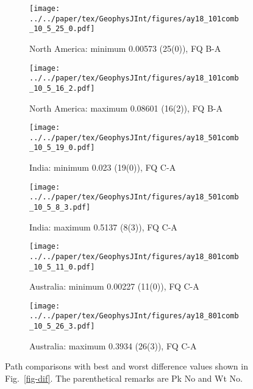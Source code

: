 \begin{figure*}
	\centering
	\begin{subfigure}{.42\textwidth} %
		\texttt{[image: ../../paper/tex/GeophysJInt/figures/ay18\_101comb\_10\_5\_25\_0.pdf]}
		\caption{North America: minimum 0.00573 (25(0)), FQ
		B-A}\label{fig-nac-105250}
	\end{subfigure}
	\begin{subfigure}{.42\textwidth} %
		\texttt{[image: ../../paper/tex/GeophysJInt/figures/ay18\_101comb\_10\_5\_16\_2.pdf]}
		\caption{North America: maximum 0.08601 (16(2)), FQ
		B-A}\label{fig-nac-105162}
	\end{subfigure}
	\vspace{.1em}
	\begin{subfigure}{.42\textwidth}
		\texttt{[image: ../../paper/tex/GeophysJInt/figures/ay18\_501comb\_10\_5\_19\_0.pdf]}
		\caption{India: minimum 0.023 (19(0)), FQ C-A}\label{fig-ind-105190}
	\end{subfigure}
	\begin{subfigure}{.42\textwidth}
		\texttt{[image: ../../paper/tex/GeophysJInt/figures/ay18\_501comb\_10\_5\_8\_3.pdf]}
		\caption{India: maximum 0.5137 (8(3)), FQ C-A}\label{fig-ind-10583}
	\end{subfigure}
	\vspace{.1em}
	\begin{subfigure}{.42\textwidth}
		\texttt{[image: ../../paper/tex/GeophysJInt/figures/ay18\_801comb\_10\_5\_11\_0.pdf]}
		\caption{Australia: minimum 0.00227 (11(0)), FQ C-A}\label{fig-au-105110}
	\end{subfigure}
	\begin{subfigure}{.42\textwidth}
		\texttt{[image: ../../paper/tex/GeophysJInt/figures/ay18\_801comb\_10\_5\_26\_3.pdf]}
		\caption{Australia: maximum 0.3934 (26(3)), FQ C-A}\label{fig-au-105263}
	\end{subfigure}
	\caption[Best and worst differences (10 Myr bin, 5 Myr step)]{Path
comparisons with best and worst difference values shown in Fig.~\ref{fig-dif}.
The parenthetical remarks are Pk No and Wt No.}\label{fig-difbw}
\end{figure*}

